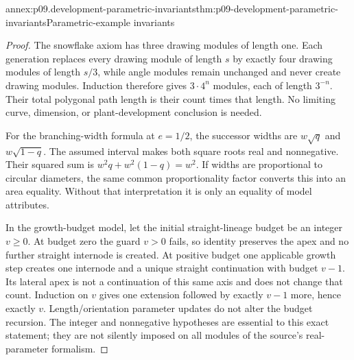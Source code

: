 \begin{annexitem}{annex:p09.development-parametric-invariants}{thm:p09-development-parametric-invariants}{Parametric-example invariants}
\begin{proof}
The snowflake axiom has three drawing modules of length one.
Each generation replaces every drawing module of length \(s\) by
exactly four drawing modules of length \(s/3\), while angle modules
remain unchanged and never create drawing modules. Induction therefore
gives \(3\cdot4^n\) modules, each of length \(3^{-n}\).
Their total polygonal path length is their count times that length.
No limiting curve, dimension, or plant-development conclusion is needed.

For the branching-width formula at \(e=1/2\), the successor widths
are \(w\sqrt q\) and \(w\sqrt{1-q}\). The assumed interval makes both
square roots real and nonnegative. Their squared sum is
\(w^2q+w^2(1-q)=w^2\). If widths are proportional to circular diameters,
the same common proportionality factor converts this into an area equality.
Without that interpretation it is only an equality of model attributes.

In the growth-budget model, let the initial straight-lineage budget
be an integer \(v\geq0\). At budget zero the guard \(v>0\) fails, so
identity preserves the apex and no further straight internode is created.
At positive budget one applicable growth step creates one internode
and a unique straight continuation with budget \(v-1\). Its lateral
apex is not a continuation of this same axis and does not change that
count. Induction on \(v\) gives one extension followed by exactly \(v-1\)
more, hence exactly \(v\). Length/orientation parameter updates do not
alter the budget recursion. The integer and nonnegative hypotheses are
essential to this exact statement; they are not silently imposed on all
modules of the source's real-parameter formalism.
\end{proof}
\end{annexitem}

